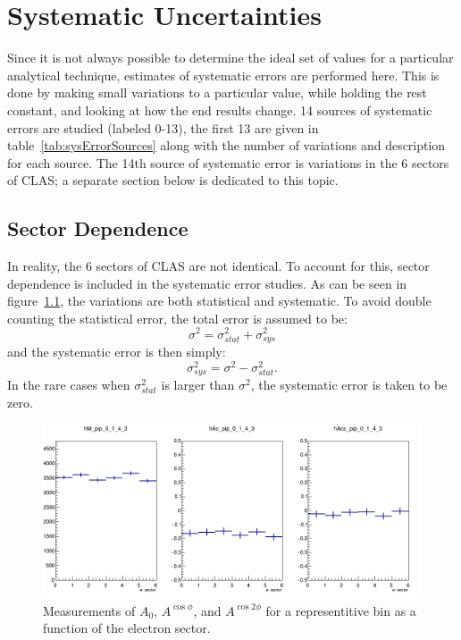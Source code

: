 \chapter{Systematic Uncertainties}
\label{cha:SystematicUncertainties}

Since it is not always possible to determine the ideal set of values for a particular analytical technique, estimates of systematic errors are performed here.
This is done by making small variations to a particular value, while holding the rest constant, and looking at how the end results change.
14 sources of systematic errors are studied (labeled 0-13), the first 13 are given in table~\ref{tab:sysErrorSources} along with the number of variations and description for each source.
The 14th source of systematic error is variations in the 6 sectors of CLAS; a separate section below is dedicated to this topic.

\section{Sector Dependence}
\label{sec:SectorDependence}
In reality, the 6 sectors of CLAS are not identical.
To account for this, sector dependence is included in the systematic error studies.
As can be seen in figure~\ref{fig:sectorDep_0_1_4_3}, the variations are both statistical and systematic.
To avoid double counting the statistical error, the total error is assumed to be:
%
\begin{equation}
\label{eq:totalError_stat_sys}
\sigma^2 = \sigma^2_{stat} + \sigma^2_{sys}
\end{equation}
%
and the systematic error is then simply:
%
\begin{equation}
\label{eq:sysError_sectorDep}
\sigma^2_{sys} = \sigma^2 - \sigma^2_{stat}.
\end{equation}
%
In the rare cases when $\sigma^2_{stat}$ is larger than $\sigma^2$, the systematic error is taken to be zero.
%
\begin{figure}[htp]
\centering
\includegraphics[width=6in]{figures/sectorDep_0_1_4_3.png}
\caption{Measurements of $A_0$, $A^{\cos\phi}$, and $A^{\cos2\phi}$ for a representitive bin as a function of the electron sector.}
\label{fig:sectorDep_0_1_4_3}
\end{figure}
%

